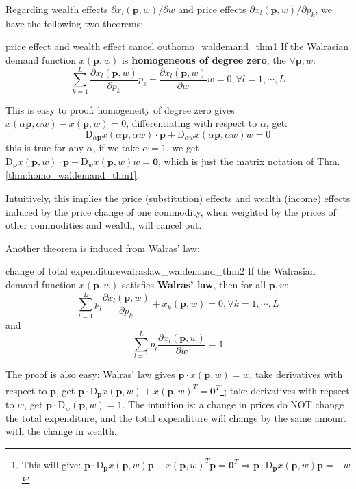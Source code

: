 Regarding wealth effects $\partial x_l(\mathbf{p},w)/\partial w$ and price effects $\partial x_l(\mathbf{p},w)/\partial p_k$, we have the following two theorems:

\begin{theorem}{price effect and wealth effect cancel out}{homo_waldemand_thm1}
    If the Walrasian demand function $ x(\mathbf{p},w)$ is \textbf{homogeneous of degree zero}, the $\forall \mathbf{p},w$:
    $$\sum^L_{k=1}\frac{\partial x_l(\mathbf{p},w)}{\partial p_k}p_k +\frac{\partial x_l(\mathbf{p},w)}{\partial w}w=0,\forall l=1,\cdots,L$$
\end{theorem}

This is easy to proof: homogeneity of degree zero gives $ x(\alpha \mathbf{p},\alpha w)- x(\mathbf{p},w)=0$, differentiating with respect to $\alpha$, get:
$$\mathrm{D}_{\alpha \mathbf{p}} x(\alpha \mathbf{p},\alpha w)\cdot \mathbf{p} + \mathrm{D}_{\alpha w}  x(\alpha \mathbf{p},\alpha w)w=0$$
this is true for any $\alpha$, if we take $\alpha=1$, we get $\mathrm{D}_{\mathbf{p}} x(\mathbf{p}, w)\cdot \mathbf{p} + \mathrm{D}_{w}  x( \mathbf{p}, w)w=\mathbf{0}$, which is just the matrix notation of Thm.\ref{thm:homo_waldemand_thm1}.

Intuitively, this implies the price (substitution) effects and wealth (income) effects induced by the price change of one commodity, when weighted by the prices of other commodities and wealth, will cancel out.

Another theorem is induced from Walras' law:
\begin{theorem}{change of total expenditure}{walraslaw_waldemand_thm2}
    If the Walrasian demand function $ x(\mathbf{p},w)$ satisfies \textbf{Walras' law}, then for all $\mathbf{p},w$:
    $$\sum^L_{l=1}p_l\frac{\partial x_l(\mathbf{p},w)}{\partial p_k}+x_k(\mathbf{p},w)=0,\forall k=1,\cdots,L$$
    and
    $$\sum^L_{l=1}p_l\frac{\partial x_l(\mathbf{p},w)}{\partial w}=1$$
\end{theorem}

The proof is also easy: Walras' law gives $\mathbf{p}\cdot  x(\mathbf{p},w)=w$, take derivatives with respect to $\mathbf{p}$, get $\mathbf{p}\cdot \mathrm{D}_{\mathbf{p}} x(\mathbf{p},w)+ x(\mathbf{p},w)^T=\mathbf{0}^T$\footnote{This will give: $\mathbf{p}\cdot \mathrm{D}_{\mathbf{p}} x(\mathbf{p},w)\mathbf{p}+ x(\mathbf{p},w)^T\mathbf{p}=\mathbf{0}^T\Rightarrow \mathbf{p}\cdot \mathrm{D}_{\mathbf{p}} x(\mathbf{p},w)\mathbf{p}=-w$}; take derivatives with repsect to $w$, get $\mathbf{p}\cdot \mathrm{D}_{w}(\mathbf{p},w)=1$. 
The intuition is: a change in prices do NOT change the total expenditure, and the total expenditure will change by the same amount with the change in wealth.

